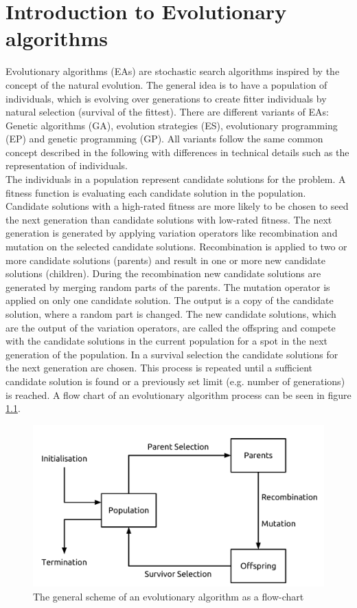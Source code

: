 \newpage
\chapter{Introduction to Evolutionary algorithms}
\label{sec:EA}
Evolutionary algorithms (EAs) are stochastic search algorithms inspired by the concept of the natural evolution. The general idea is to have a population of individuals, which is evolving over generations to create fitter individuals by natural selection (survival of the fittest). There are different variants of EAs: Genetic algorithms (GA), evolution strategies (ES), evolutionary programming (EP) and genetic programming (GP). All variants follow the same common concept described in the following with differences in technical details such as the representation of individuals\cite{Eiben}.\\
The individuals in a population represent candidate solutions for the problem. A fitness function is evaluating each candidate solution in the population. Candidate solutions with a high-rated fitness are more likely to be chosen to seed the next generation than candidate solutions with low-rated fitness. The next generation is generated by applying variation operators like recombination and mutation on the selected candidate solutions. Recombination is applied to two or more candidate solutions (parents) and result in one or more new candidate solutions (children). During the recombination new candidate solutions are generated by merging random parts of the parents. The mutation operator is applied on only one candidate solution. The output is a copy of the candidate solution, where a random part is changed. The new candidate solutions, which are the output of the variation operators, are called the offspring and compete with the candidate solutions in the current population for a spot in the next generation of the population. In a survival selection the candidate solutions for the next generation are chosen. This process is repeated until a sufficient candidate solution is found or a previously set limit (e.g. number of generations) is reached. A flow chart of an evolutionary algorithm process can be seen in figure \ref{fig:eaflowchart}.\\
\begin{figure}
    \centering
    \includegraphics[scale=0.4]{./Figures/EAFlowchart}
    \caption{The general scheme of an evolutionary algorithm as a flow-chart \cite{Eiben}}
    \label{fig:eaflowchart}
\end{figure}
